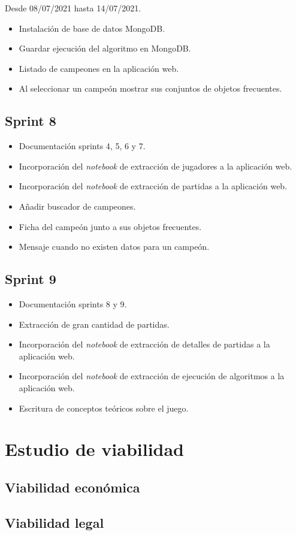 Desde 08/07/2021 hasta 14/07/2021.

\begin{itemize}
    \item Instalación de base de datos MongoDB.
    \item Guardar ejecución del algoritmo en MongoDB.
    \item Listado de campeones en la aplicación web.
    \item Al seleccionar un campeón mostrar sus conjuntos de objetos frecuentes.
\end{itemize}

\subsection{Sprint 8}

\begin{itemize}
    \item Documentación sprints 4, 5, 6 y 7.
    \item Incorporación del \textit{notebook} de extracción de jugadores a la aplicación web.
 	\item Incorporación del \textit{notebook} de extracción de partidas a la aplicación web.
 	\item Añadir buscador de campeones.
 	\item Ficha del campeón junto a sus objetos frecuentes.
 	\item Mensaje cuando no existen datos para un campeón.
\end{itemize}

\subsection{Sprint 9}

\begin{itemize}
	\item Documentación sprints 8 y 9.
	\item Extracción de gran cantidad de partidas.
    \item Incorporación del \textit{notebook} de extracción de detalles de partidas a la aplicación web.
    \item Incorporación del \textit{notebook} de extracción de ejecución de algoritmos a la aplicación web.
    \item Escritura de conceptos teóricos sobre el juego.
\end{itemize}

\section{Estudio de viabilidad}

\subsection{Viabilidad económica}

\subsection{Viabilidad legal}


